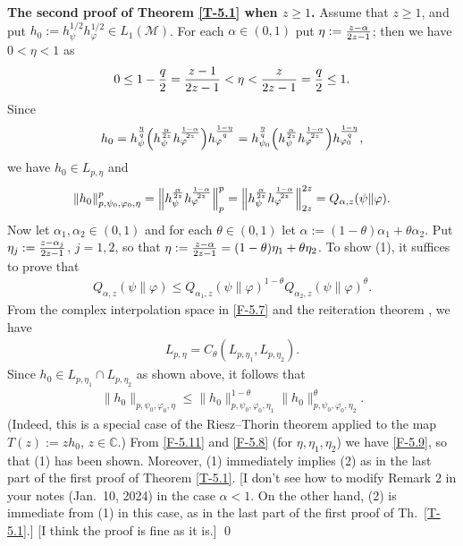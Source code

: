 \documentclass[12pt]{article}
\theoremstyle{definition}
\theoremstyle{remark}
\numberwithin{equation}{section}
\def\Me{\mathcal M}
\def\ffi{\varphi}
\def\bC{\mathbb{C}}
\begin{document}
\bigskip\noindent
{\bf The second proof of Theorem \ref{T-5.1} when $z\ge1$.}\enspace
Assume that $z\ge1$, and put $h_0:=h_\psi^{1/2}h_\ffi^{1/2}\in L_1(\Me)$. For each $\alpha\in(0,1)$ put
$\eta:={z-\alpha\over2z-1}$; then we have $0<\eta<1$ as
\[
0\le1-{q\over2}={z-1\over2z-1}<\eta<{z\over2z-1}={q\over2}\le1.
\]
Since
\[
h_0=h_\psi^{\eta\over q}\Bigl(h_\psi^{\alpha\over2z}h_\ffi^{1-\alpha\over2z}\Bigr)h_\ffi^{1-\eta\over q}
=h_{\psi_0}^{\eta\over q}\Bigl(h_\psi^{\alpha\over2z}h_\ffi^{1-\alpha\over2z}\Bigr)h_{\ffi_0}^{1-\eta\over q},
\]
we have $h_0\in L_{p,\eta}$ and
\begin{align}\label{F-5.8}
\|h_0\|_{p,\psi_0,\ffi_0,\eta}^p=\Big\|h_\psi^{\alpha\over2z}h_\ffi^{1-\alpha\over2z}\Big\|_p^p
=\Big\|h_\psi^{\alpha\over2z}h_\ffi^{1-\alpha\over2z}\Big\|_{2z}^{2z}=Q_{\alpha,z}(\psi\|\ffi).
\end{align}
Now let $\alpha_1,\alpha_2\in(0,1)$ and for each $\theta\in(0,1)$ let
$\alpha:=(1-\theta)\alpha_1+\theta\alpha_2$. Put $\eta_j:={z-\alpha_j\over2z-1}$, $j=1,2$, so that
$\eta:={z-\alpha\over2z-1}=(1-\theta)\eta_1+\theta\eta_2$. To show (1), it suffices to prove that
\begin{align}\label{F-5.9}
Q_{\alpha,z}(\psi\|\ffi)\le Q_{\alpha_1,z}(\psi\|\ffi)^{1-\theta}Q_{\alpha_2,z}(\psi\|\ffi)^\theta.
\end{align}
From the complex interpolation space in \eqref{F-5.7} and the reiteration theorem \cite{cwikel1978complex},
we have
\begin{align}\label{F-5.10}
L_{p,\eta}=C_\theta(L_{p,\eta_1},L_{p,\eta_2}).
\end{align}
Since $h_0\in L_{p,\eta_1}\cap L_{p,\eta_2}$ as shown above, it follows that
\begin{align}\label{F-5.11}
\|h_0\|_{p,\psi_0,\ffi_0,\eta}\le\|h_0\|_{p,\psi_0,\ffi_0,\eta_1}^{1-\theta}\|h_0\|_{p,\psi_0,\ffi_0,\eta_2}^\theta.
\end{align}
(Indeed, this is a special case of the Riesz--Thorin theorem applied to the map $T(z):=zh_0$, $z\in\bC$.)
From \eqref{F-5.11} and \eqref{F-5.8} (for $\eta,\eta_1,\eta_2$) we have \eqref{F-5.9}, so that (1) has been
shown. Moreover, (1) immediately implies (2) as in the last part of the first proof of Theorem \ref{T-5.1}.
{\color{red}[I don't see how to modify Remark 2 in your notes (Jan.\ 10, 2024) in the case $\alpha<1$. On
the other hand, (2) is immediate from (1) in this case, as in the last part of the first proof of Th.~\ref{T-5.1}.]}
{\color{orange} [I think the proof is fine as it is.]}
\qed
\end{document}
